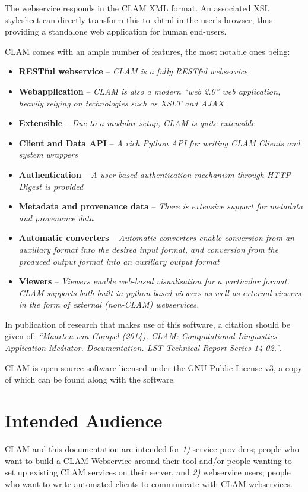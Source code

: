 \documentclass[a4paper,12pt]{report}
\begin{document}
The webservice responds in the CLAM XML format. An associated XSL stylesheet
\cite{XSLT} can directly transform this to xhtml in the user's browser, thus
providing a standalone web application for human end-users. 

CLAM comes with an ample number of features, the most notable ones being:

\begin{itemize}
\item \textbf{RESTful webservice} -- \emph{CLAM is a fully RESTful webservice}
\item \textbf{Webapplication} -- \emph{CLAM is also a modern ``web 2.0'' web application, heavily relying on technologies such as XSLT and AJAX}
\item \textbf{Extensible} -- \emph{Due to a modular setup, CLAM is quite extensible}
\item \textbf{Client and Data API} -- \emph{A rich Python API for writing CLAM Clients and system wrappers}
\item \textbf{Authentication} -- \emph{A user-based authentication mechanism through HTTP Digest is provided}
\item \textbf{Metadata and provenance data} -- \emph{There is extensive support for metadata and provenance data}
\item \textbf{Automatic converters} -- \emph{Automatic converters enable conversion from an auxiliary format into the desired input format, and conversion from the produced output format into an auxiliary output format}
\item \textbf{Viewers} -- \emph{Viewers enable web-based visualisation for a particular format. CLAM supports both built-in python-based viewers as well as external viewers in the form of external (non-CLAM) webservices.}
\end{itemize}

In publication of research that makes use of this software, a citation should
be given of: {\em ``Maarten van Gompel (2014). CLAM: Computational Linguistics
Application Mediator. Documentation. LST Technical Report Series 14-02.''}.

CLAM is open-source software licensed under the GNU Public License v3, a copy
of which can be found along with the software.

\section{Intended Audience}

CLAM and this documentation are intended for \emph{1)} service providers;
people who want to build a CLAM Webservice around their tool and/or people
wanting to set up existing CLAM services on their server, and \emph{2)}
webservice users; people who want to write automated clients to communicate
with CLAM webservices. 
\end{document}
